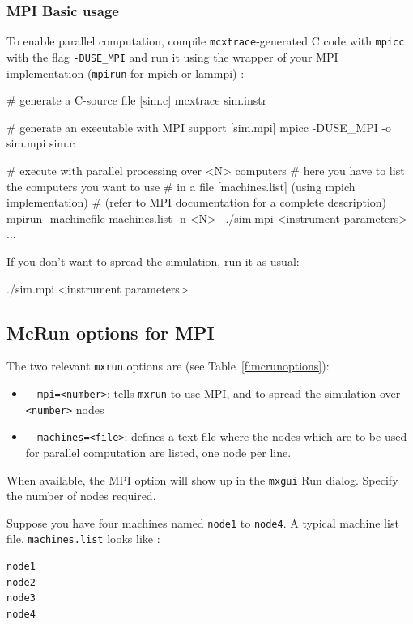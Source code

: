\subsubsection{MPI Basic usage}

To enable parallel computation, compile \texttt{mcxtrace}-generated C code
with \verb'mpicc' with the flag \verb'-DUSE_MPI' and run it using the
wrapper of your MPI implementation (\verb'mpirun' for mpich or lammpi) :
\begin{bash}
  # generate a C-source file [sim.c]
  mcxtrace sim.instr

  # generate an executable with MPI support [sim.mpi]
  mpicc -DUSE_MPI -o sim.mpi sim.c

  # execute with parallel processing over <N> computers
  # here you have to list the computers you want to use
  # in a file [machines.list] (using mpich implementation)
  # (refer to MPI documentation for a complete description)
  mpirun -machinefile machines.list -n <N> \
         ./sim.mpi <instrument parameters>
  ...
\end{bash}

If you don't want to spread the simulation, run it as usual:
\begin{bash}
  ./sim.mpi <instrument parameters>
\end{bash}

\subsection{McRun options for MPI}

The two relevant \verb+mxrun+ options are (see Table~\ref{f:mcrunoptions}):
\begin{itemize}
\item \verb'--mpi=<number>': tells \verb'mxrun' to use MPI, and to
  spread the simulation over \verb'<number>' nodes
\item \verb'--machines=<file>': defines a text file where the nodes which are to
  be used for parallel computation are listed, one node per line.
\end{itemize}
When available, the MPI option will show up in the \verb+mxgui+ Run
dialog. Specify the number of nodes required.

Suppose you have four machines named \verb'node1' to \verb'node4'.
A typical machine list file, \verb'machines.list' looks like :
\begin{lstlisting}
node1
node2
node3
node4
\end{lstlisting}

